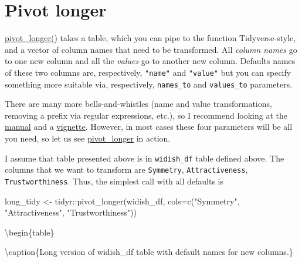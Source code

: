 \documentclass[
]{book}
\newenvironment{Shaded}{\begin{snugshade}}{\end{snugshade}}
\newcommand{\AttributeTok}[1]{\textcolor[rgb]{0.77,0.63,0.00}{#1}}
\newcommand{\FunctionTok}[1]{\textcolor[rgb]{0.00,0.00,0.00}{#1}}
\newcommand{\NormalTok}[1]{#1}
\newcommand{\OtherTok}[1]{\textcolor[rgb]{0.56,0.35,0.01}{#1}}
\newcommand{\SpecialCharTok}[1]{\textcolor[rgb]{0.00,0.00,0.00}{#1}}
\newcommand{\StringTok}[1]{\textcolor[rgb]{0.31,0.60,0.02}{#1}}
\begin{document}
\hypertarget{pivot-longer}{%
\section{Pivot longer}\label{pivot-longer}}

\href{https://tidyr.tidyverse.org/reference/pivot_longer.html}{pivot\_longer()} takes a table, which you can pipe to the function Tidyverse-style, and a vector of column names that need to be transformed. All \emph{column names} go to one new column and all the \emph{values} go to another new column. Defaults names of these two columns are, respectively, \texttt{"name"} and \texttt{"value"} but you can specify something more suitable via, respectively, \texttt{names\_to} and \texttt{values\_to} parameters.

There are many more bells-and-whistles (name and value transformations, removing a prefix via regular expressions, etc.), so I recommend looking at the \href{https://tidyr.tidyverse.org/reference/pivot_longer.html}{manual} and a \href{https://tidyr.tidyverse.org/articles/pivot.html}{vignette}. However, in most cases these four parameters will be all you need, so let us see \href{https://tidyr.tidyverse.org/reference/pivot_longer.html}{pivot\_longer} in action.

I assume that table presented above is in \texttt{widish\_df} table defined above. The columns that we want to transform are \texttt{Symmetry}, \texttt{Attractiveness}, \texttt{Trustworthiness}. Thus, the simplest call with all defaults is

\begin{Shaded}
\begin{Highlighting}[]
\NormalTok{long\_tidy }\OtherTok{\textless{}{-}}\NormalTok{ tidyr}\SpecialCharTok{::}\FunctionTok{pivot\_longer}\NormalTok{(widish\_df, }
                               \AttributeTok{cols=}\FunctionTok{c}\NormalTok{(}\StringTok{"Symmetry"}\NormalTok{, }\StringTok{"Attractiveness"}\NormalTok{, }\StringTok{"Trustworthiness"}\NormalTok{))}
\end{Highlighting}
\end{Shaded}

\textbackslash begin\{table\}

\textbackslash caption\{\label{tab:unnamed-chunk-208}Long version of widish\_df table with default names for new columns.\}
\centering
\end{document}
